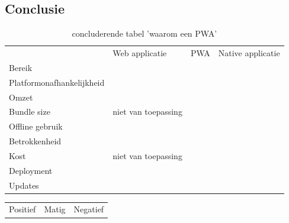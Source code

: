 	\autocite{Apple2020d}
	\autocite{AndroidDevelopers2020}
		

\subsection{Conclusie}
	\begin{table}[H]
		\centering
		\begin{tabular}{llll}
			                         			  & Web applicatie 	 				 & PWA								 & Native applicatie \\
			Bereik                   		   & \cellcolor{green!40}      		 & \cellcolor{green!40}			& \cellcolor{red!50}\\
			Platformonafhankelijkheid   & \cellcolor{green!40}      	  & \cellcolor{orange!50}		& \cellcolor{red!50}\\
			Omzet   						  & \cellcolor{red!50}      		 & \cellcolor{orange!50}		& \cellcolor{green!40}\\
			Bundle size						  & niet van toepassing      		& \cellcolor{green!40}		   & \cellcolor{red!50}\\
			Offline gebruik					 & \cellcolor{red!50}      		    & \cellcolor{green!40}			& \cellcolor{green!40}\\
			Betrokkenheid 					& \cellcolor{red!50}      		   & \cellcolor{orange!50}		 & \cellcolor{green!40}\\
			Kost 								& niet van toepassing     		  & \cellcolor{green!40}		 & \cellcolor{red!50}\\
			Deployment 						& \cellcolor{green!40}      	  & \cellcolor{green!40}		 & \cellcolor{red!50}\\
			Updates	   						& \cellcolor{green!40}      	  & \cellcolor{green!40}		 & \cellcolor{red!50}\\
		\end{tabular}
		\caption{concluderende tabel 'waarom een PWA'}
	\end{table}
	
	\begin{table}[H]
		\centering
		\begin{tabular}{lll}
			Positief \cellcolor{green!40} & Matig \cellcolor{orange!50} & Negatief  \cellcolor{red!50}
		\end{tabular}
	\end{table}
	
	
